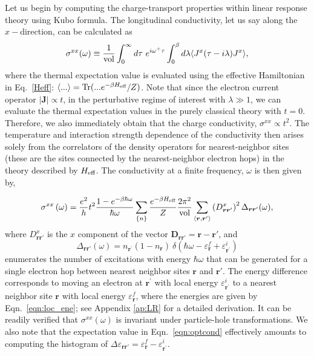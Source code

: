 \documentclass[aps,prx,onecolumn,amsmath,nofootinbib,amssymb,11pt]{revtex4-1}
\renewcommand{\vec}[1]{\boldsymbol{#1}}
\def \r {{\vec r}}
\def \beq {\begin{eqnarray}}
\def \eeq {\end{eqnarray}}
\def \tn {\textnormal}
\begin{document}
{Let us begin by computing the charge-transport properties within linear response theory using Kubo formula. The longitudinal conductivity, let us say along the $x-$direction, can be calculated as
\beq
\sigma^{xx}(\omega) \equiv \frac{1}{\tn{vol}} \int_0^\infty d\tau~e^{i\omega^+\tau} \int_0^\beta d\lambda \langle J^x(\tau-i\lambda) J^x\rangle,
\label{cond}
\eeq
where the thermal expectation value is evaluated using the effective Hamiltonian in Eq.~\ref{Heff}: $\langle...\rangle = \tn{Tr}(...e^{-\beta H_{\tn{eff}}}/Z)$. Note that since the electron current operator $|\vec{J}|\propto t$, in the perturbative regime of interest with $\lambda\gg1$, we can evaluate the thermal expectation values in the purely classical theory with $t=0$. Therefore, we also immediately obtain that the charge conductivity, $\sigma^{xx}\propto t^2$. The temperature and interaction strength dependence of the conductivity then arises solely from the correlators of the density operators for nearest-neighbor sites (these are the sites connected by the nearest-neighbor electron hops) in the theory described by $H_\tn{eff}$.  The conductivity at a finite frequency, $\omega$ is then given by, 

\beq
\sigma^{xx}\left(\omega\right)=\frac{e^{2}}{h} t^2 \frac{1-e^{-\beta\hbar\omega}}{\hbar \omega}\sum_{\{n\}}\frac{e^{-\beta H_{\tn{eff}}}}{Z}\frac{2\pi^{2}}{\tn{vol}}\sum_{\left\langle \r,\r'\right\rangle }\left( D_{\r\r'}^{x}\right)^{2}\Delta_{\r\r'}(\omega),\label{eqn:optcond}
\eeq 
where $D_{\r\r'}^{x}$ is the $x$ component of the vector $\bm{D}_{\r\r'}=\r - \r'$, and 
\begin{equation}
\Delta_{\r\r'}(\omega)=n_{\r^{\prime}} (1-n_{\r})~\delta(\hbar \omega - \varepsilon^{f}_{\r} + \varepsilon^{i}_{\r^{\prime}} )
\label{eqn:spec_weight}
\end{equation}
enumerates the number of excitations with energy $\hbar\omega$ that can be generated for a single electron hop between nearest neighbor sites $\r$ and $\r'$. The energy difference corresponds to moving an electron at $\r^\prime$ with local energy $\varepsilon_{\r^\prime}^{i}$ to a nearest neighbor site $\r$ with local energy $\varepsilon_{\r}^{f}$, where the energies are given by Eqn.~\ref{eqn:loc_ene}; see Appendix  \ref{ap:LR} for a detailed derivation. It can be readily verified that $\sigma^{xx} (\omega)$ is invariant under particle-hole transformations. We also note that the expectation value in Eqn.~\ref{eqn:optcond} effectively amounts to computing the histogram of $ \Delta  \varepsilon_{\r\r'}=\varepsilon^{f}_{\r} - \varepsilon^{i}_{\r^{\prime}}$. 

}
\end{document}
